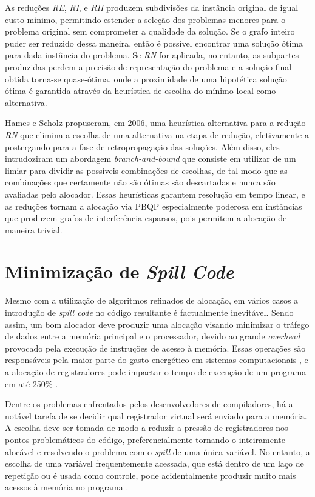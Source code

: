 \documentclass[
	12pt,				%
	openright,			%
	oneside,			%
	a4paper,			%
	tccpreliminar,			%
	]{ABNT-DC-UEL}
\begin{document}
As reduções \textit{RE}, \textit{RI}, e \textit{RII} produzem subdivisões da instância original de igual custo mínimo, permitindo estender a seleção dos problemas menores para o problema original sem comprometer a qualidade da solução. Se o grafo inteiro puder ser reduzido dessa maneira, então é possível encontrar uma solução ótima para dada instância do problema. Se \textit{RN} for aplicada, no entanto, as subpartes produzidas perdem a precisão de representação do problema e a solução final obtida torna-se quase-ótima, onde a proximidade de uma hipotética solução ótima é garantida através da heurística de escolha do mínimo local como alternativa.

Hames e Scholz \cite{hames:06} propuseram, em 2006, uma heurística alternativa para a redução \textit{RN} que elimina a escolha de uma alternativa na etapa de redução, efetivamente a postergando para a fase de retropropagação das soluções. Além disso, eles intrudoziram um abordagem \textit{branch-and-bound} que consiste em utilizar de um limiar para dividir as possíveis combinações de escolhas, de tal modo que as combinações que certamente não são ótimas são descartadas e nunca são avaliadas pelo alocador. Essas heurísticas garantem resolução em tempo linear, e as reduções tornam a alocação via PBQP especialmente poderosa em instâncias que produzem grafos de interferência esparsos, pois permitem a alocação de maneira trivial.

\chapter{Minimização de \textit{Spill Code}}

Mesmo com a utilização de algoritmos refinados de alocação, em vários casos a introdução de \textit{spill code} no código resultante é factualmente inevitável. Sendo assim, um bom alocador deve produzir uma alocação visando minimizar o tráfego de dados entre a memória principal e o processador, devido ao grande \textit{overhead} provocado pela execução de instruções de acesso à memória. Essas operações são responsáveis pela maior parte do gasto energético em sistemas computacionais \cite{verma:06}, e a alocação de registradores pode impactar o tempo de execução de um programa em até 250\% \cite{pereira:08}.

Dentre os problemas enfrentados pelos desenvolvedores de compiladores, há a notável tarefa de se decidir qual registrador virtual será enviado para a memória. A escolha deve ser tomada de modo a reduzir a pressão de registradores nos pontos problemáticos do código, preferencialmente tornando-o inteiramente alocável e resolvendo o problema com o \textit{spill} de uma única variável. No entanto, a escolha de uma variável frequentemente acessada, que está dentro de um laço de repetição ou é usada como controle, pode acidentalmente produzir muito mais acessos à memória no programa \cite{chaitin:82, bernstein:89}.
\end{document}
